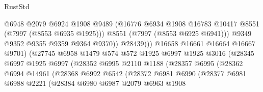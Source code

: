 \begin{lexlean}{RustStd}
\begin{coremodule}
                                      @6948
                                      @2079
                                      @6924
                                      @1908
                                      @9489
                                      (@16776
                                        @6934
                                        @1908
                                        @16783
                                        @10417
                                        @8551
                                        (@7997 (@8553 @6935 @1925)))
                                      @8551
                                      (@7997 (@8553 @6925 @6941)))
                                    @9349
                                    @9352
                                    @9355
                                    @9359
                                    @9364
                                    @9370))
                                @28439)))
                          @16658
                          @16661
                          @16664
                          @16667
                          @9701)
                        (@27745
                          @6958
                          @1479
                          @574
                          @572
                          @1925
                          @6997
                          @1925
                          @3016
                          (@28345
                            @6997
                            @1925
                            @6997
                            (@28352
                              @6995
                              @2110
                              @1188
                              (@28357
                                @6995
                                (@28362
                                  @6994
                                  @14961
                                  (@28368
                                    @6992
                                    @6542
                                    (@28372
                                      @6981
                                      @6990
                                      (@28377
                                        @6981
                                        @6988
                                        @2221
                                        (@28384
                                          @6980
                                          @6987
                                          @2079
                                          @6963
                                          @1908

\end{coremodule}
\end{lexlean}
